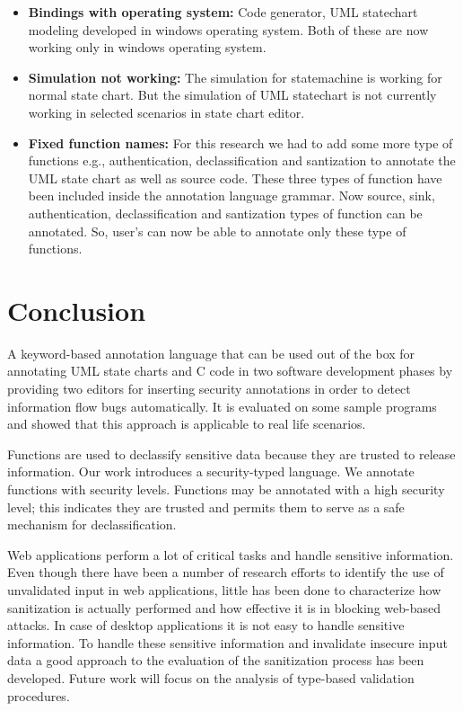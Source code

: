 \begin{itemize}
	
	\item \textbf{Bindings with operating system:}  Code generator, UML statechart modeling developed in windows operating system. Both of these are now working only in windows operating system.
	
	\item \textbf{Simulation not working:} The simulation for statemachine is working for normal state chart. But the simulation of UML statechart is not currently working in selected scenarios in state chart editor.
	
	\item \textbf{Fixed function names:} For this research we had to add some more type of functions e.g., authentication, declassification and santization to annotate the UML state chart as well as source code. These three types of function have been included inside the annotation language grammar. Now source, sink, authentication, declassification and santization types of function can be annotated. So, user's can now be able to annotate only these type of functions.
	
\end{itemize}

\section{Conclusion}
A keyword-based annotation language that can be used out of the box for annotating UML state charts and C code in two software development phases by providing two editors for inserting security annotations in order to detect information flow bugs automatically. It is evaluated on some sample programs and showed that this approach is applicable to real life scenarios.

Functions are used to declassify sensitive data because they are trusted to release information. Our work introduces a security-typed language. We annotate functions with security levels. Functions may be annotated with a high security level; this indicates they are trusted and permits them to serve as a safe mechanism for declassification.

Web applications perform a lot of critical tasks and
handle sensitive information. Even though there have been
a number of research efforts to identify the use of unvalidated input in web applications, little has been done
to characterize how sanitization is actually performed and
how effective it is in blocking web-based attacks. In case of desktop applications it is not easy to handle sensitive information. To handle these sensitive information and invalidate insecure input data a good approach to the evaluation of the sanitization process has been developed. Future work will focus on the analysis of type-based validation procedures.

